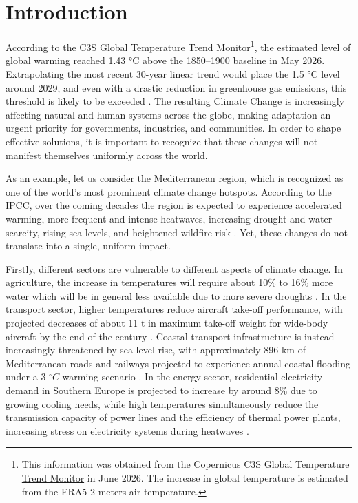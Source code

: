 
\chapter{Introduction}  %
\label{chapter 1}


According to the C3S Global Temperature Trend Monitor\footnote{This information was obtained from the Copernicus \href{https://apps.climate.copernicus.eu/global-temperature-trend-monitor}{C3S Global Temperature Trend Monitor} in June 2026. The increase in global temperature is estimated from the ERA5 2 meters air temperature.}, the estimated level of global warming reached 1.43 °C above the 1850–1900 baseline in May 2026. Extrapolating the most recent 30-year linear trend would place the 1.5 °C level around 2029, and even with a drastic reduction in greenhouse gas emissions, this threshold is likely to be exceeded \citep{bevacqua_year_2025}. The resulting Climate Change is increasingly affecting natural and human systems across the globe, making adaptation an urgent priority for governments, industries, and communities. In order to shape effective solutions, it is important to recognize that these changes will not manifest themselves uniformly across the world.

As an example, let us consider the Mediterranean region, which is recognized as one of the world's most prominent climate change hotspots. According to the IPCC, over the coming decades the region is expected to experience accelerated warming, more frequent and intense heatwaves, increasing drought and water scarcity, rising sea levels, and heightened wildfire risk \citep{ali_cross-chapter_2022}. Yet, these changes do not translate into a single, uniform impact. 

Firstly, different sectors are vulnerable to different aspects of climate change. In agriculture, the increase in temperatures will require about 10\% to 16\% more water which will be in general less available due to more severe droughts \citep{masia_modelling_2021}. In the transport sector, higher temperatures reduce aircraft take-off performance, with projected decreases of about 11 t in maximum take-off weight for wide-body aircraft by the end of the century \citep{gallardo_assessing_2026}. Coastal transport infrastructure is instead increasingly threatened by sea level rise, with approximately 896 km of Mediterranean roads and railways projected to experience annual coastal flooding under a 3 $^\circ C$ warming scenario \citep{nawarat_coastal_2026}. In the energy sector, residential electricity demand in Southern Europe is projected to increase by around 8\% due to growing cooling needs, while high temperatures simultaneously reduce the transmission capacity of power lines and the efficiency of thermal power plants, increasing stress on electricity systems during heatwaves \citep{dowling_impact_2013}.


